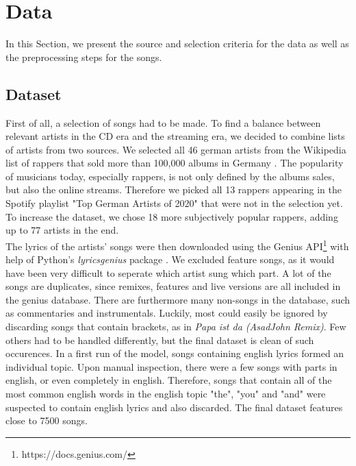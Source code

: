 \documentclass[conference]{IEEEtran}
\begin{document}
\section{Data}
In this Section, we present the source and selection criteria for the data as well as the preprocessing steps for the songs.

\subsection{Dataset}
First of all, a selection of songs had to be made. To find a balance between relevant artists in the CD era and the streaming era, we decided to combine lists of artists from two sources. We selected all 46 german artists from the Wikipedia list of rappers that sold more than 100,000 albums in Germany \cite{wiki_albums}. The popularity of musicians today, especially rappers, is not only defined by the albums sales, but also the online streams. Therefore we picked all 13 rappers appearing in the Spotify playlist "Top German Artists of 2020" \cite{spotify_2020} that were not in the selection yet. To increase the dataset, we chose 18 more subjectively popular rappers, adding up to 77 artists in the end.\\
The lyrics of the artists' songs were then downloaded using the Genius API\footnote{https://docs.genius.com/} with help of Python's \textit{lyricsgenius} package \cite{lyricsgenius}. We excluded feature songs, as it would have been very difficult to seperate which artist sung which part. A lot of the songs are duplicates, since remixes, features and live versions are all included in the genius database. There are furthermore many non-songs in the database, such as commentaries and instrumentals. Luckily, most could easily be ignored by discarding songs that contain brackets, as in \textit{Papa ist da (AsadJohn Remix)}. Few others had to be handled differently, but the final dataset is clean of such occurences. In a first run of the model, songs containing english lyrics formed an individual topic. Upon manual inspection, there were a few songs with parts in english, or even completely in english. Therefore, songs that contain all of the most common english words in the english topic "the", "you" and "and" were suspected to contain english lyrics and also discarded. The final dataset features close to 7500 songs.
\end{document}
